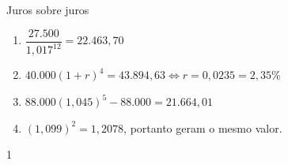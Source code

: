 \begin{answer}{Juros sobre juros}
{
\begin{enumerate}

\item{}
$\dfrac{27.500}{1{,}017^{12}}=22.463{,}70$

\item{}
$40.000(1+r)^4=43.894{,}63 \iff r=0,0235=2{,}35\%$

\item
$88.000(1{,}045)^5-88.000=21.664{,}01$

\item
$(1{,}099)^2=1{,}2078$, portanto geram o mesmo valor.

\end{enumerate}
}{1}
\end{answer}


